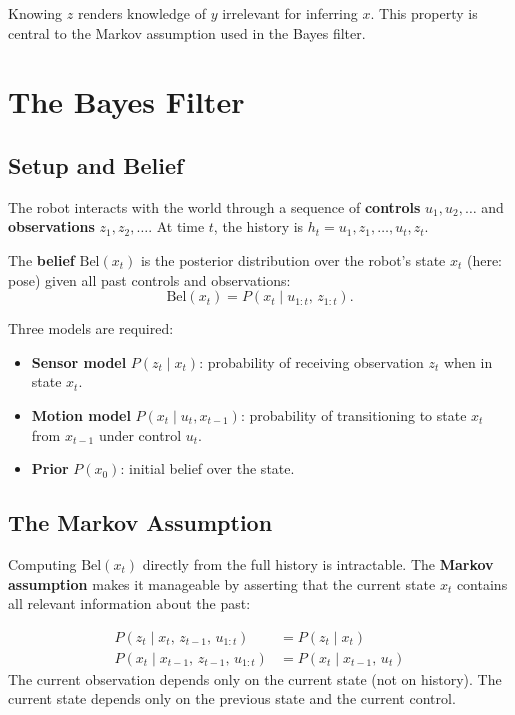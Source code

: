 \documentclass[11pt,a4paper]{article}
\theoremstyle{definition}
\theoremstyle{plain}
\theoremstyle{remark}
\begin{document}
Knowing $z$ renders knowledge of $y$ irrelevant for inferring $x$. This property is central to the Markov assumption used in the Bayes filter.

\section{The Bayes Filter}

\subsection{Setup and Belief}

The robot interacts with the world through a sequence of \textbf{controls} $u_1, u_2, \ldots$ and \textbf{observations} $z_1, z_2, \ldots$. At time $t$, the history is $h_t = u_1, z_1, \ldots, u_t, z_t$.

The \textbf{belief} $\mathrm{Bel}(x_t)$ is the posterior distribution over the robot's state $x_t$ (here: pose) given all past controls and observations:
\[
\mathrm{Bel}(x_t) = P(x_t \mid u_{1:t},\, z_{1:t}).
\]

Three models are required:
\begin{itemize}
    \item \textbf{Sensor model} $P(z_t \mid x_t)$: probability of receiving observation $z_t$ when in state $x_t$.
    \item \textbf{Motion model} $P(x_t \mid u_t, x_{t-1})$: probability of transitioning to state $x_t$ from $x_{t-1}$ under control $u_t$.
    \item \textbf{Prior} $P(x_0)$: initial belief over the state.
\end{itemize}

\subsection{The Markov Assumption}

Computing $\mathrm{Bel}(x_t)$ directly from the full history is intractable. The \textbf{Markov assumption} makes it manageable by asserting that the current state $x_t$ contains all relevant information about the past:

\begin{tcolorbox}[colback=blue!5!white,colframe=blue!75!black,title=\textbf{Markov Assumption}]
\begin{align*}
P(z_t \mid x_t,\, z_{t-1},\, u_{1:t}) &= P(z_t \mid x_t) \\
P(x_t \mid x_{t-1},\, z_{t-1},\, u_{1:t}) &= P(x_t \mid x_{t-1},\, u_t)
\end{align*}
The current observation depends only on the current state (not on history). The current state depends only on the previous state and the current control.
\end{tcolorbox}
\end{document}
